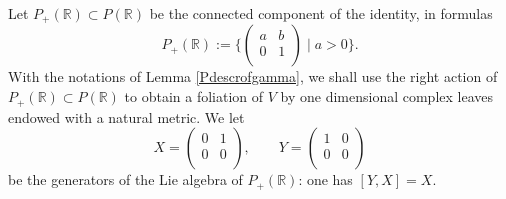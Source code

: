 \documentclass[graybox, envcountsect%
]{svmult}
\def\R{{\mathbb R}}
\begin{document}
 Let $P_+(\R)\subset P(\R)$ be the connected component of the identity, in formulas
 $$
 P_+(\R):=\{\left(
\begin{array}{cc}
 a & b \\
 0 & 1 \\
\end{array}
\right)\mid a>0\}.
 $$
 With the notations of Lemma \ref{Pdescrofgamma}, we shall use the right action of $P_+(\R)\subset P(\R)$ to obtain a foliation of $V$ by one dimensional complex leaves endowed with a natural metric. 
  We let 
 $$
 X=\left(
\begin{array}{cc}
 0 & 1 \\
 0 & 0 \\
\end{array}
\right), \qquad Y=\left(
\begin{array}{cc}
 1 & 0 \\
 0 & 0 \\
\end{array}
\right)
 $$
 be the generators of the Lie algebra of $P_+(\R)$: one has $[Y,X]=X$.
 
\end{document}
